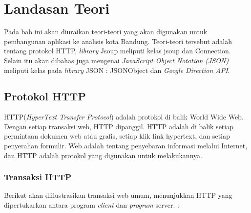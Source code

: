 \chapter{Landasan Teori}
\label{chap:teori}

Pada bab ini akan diuraikan teori-teori yang akan digunakan untuk pembangunan aplikasi ke analisis kota Bandung. Teori-teori tersebut adalah tentang protokol HTTP, \textit{library} Jsoup meliputi kelas jsoup dan Connection. Selain itu akan dibahas juga mengenai \textit{JavaScript Object Notation (JSON)} meliputi kelas pada \textit{library} JSON : JSONObject dan \textit{Google Direction API}.

\section{Protokol HTTP}
\label{sec:protocolhttp} 

HTTP(\textit{HyperText Transfer Protocol}) adalah protokol di balik World Wide Web. Dengan setiap transaksi web, HTTP dipanggil. HTTP adalah di balik setiap permintaan dokumen web atau grafis, setiap klik link hypertext, dan setiap penyerahan formulir. Web adalah tentang penyebaran informasi melalui Internet, dan HTTP adalah protokol yang digunakan untuk melakukannya.

\subsection{Transaksi HTTP}
\label{subsec:architecturehttp}

Berikut akan diilustrasikan transaksi web umum, menunjukkan HTTP yang dipertukarkan antara program \textit{client} dan \textit{program} server. \cite{wong2000http}:

